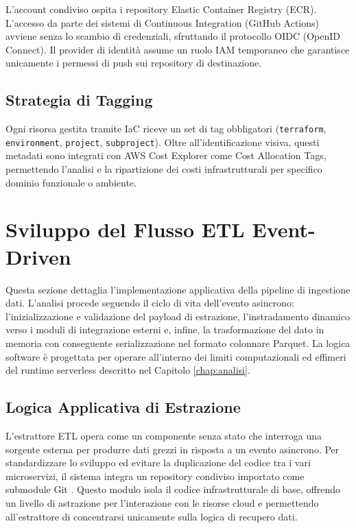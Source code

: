L'account condiviso ospita i repository Elastic Container Registry (ECR). L'accesso da parte dei sistemi di Continuous Integration (GitHub Actions) avviene senza lo scambio di credenziali, sfruttando il protocollo OIDC (OpenID Connect). Il provider di identità assume un ruolo IAM temporaneo che garantisce unicamente i permessi di push sui repository di destinazione.

\subsection{Strategia di Tagging}

Ogni risorsa gestita tramite IaC riceve un set di tag obbligatori (\texttt{terraform}, \texttt{environment}, \texttt{project}, \texttt{subproject}). Oltre all'identificazione visiva, questi metadati sono integrati con AWS Cost Explorer come Cost Allocation Tags, permettendo l'analisi e la ripartizione dei costi infrastrutturali per specifico dominio funzionale o ambiente.

\section{Sviluppo del Flusso ETL Event-Driven}
\label{sec:sviluppo-flusso-etl}
Questa sezione dettaglia l'implementazione applicativa della pipeline di ingestione dati. L'analisi procede seguendo il ciclo di vita dell'evento asincrono: l'inizializzazione e validazione del payload di estrazione, l'instradamento dinamico verso i moduli di integrazione esterni e, infine, la trasformazione del dato in memoria con conseguente serializzazione nel formato colonnare Parquet. La logica software è progettata per operare all'interno dei limiti computazionali ed effimeri del runtime serverless descritto nel Capitolo \ref{chap:analisi}.

\subsection{Logica Applicativa di Estrazione}

L'estrattore ETL opera come un componente senza stato che interroga una sorgente esterna per produrre dati grezzi in risposta a un evento asincrono. Per standardizzare lo sviluppo ed evitare la duplicazione del codice tra i vari microservizi, il sistema integra un repository condiviso importato come submodule Git \cite{Submodules}. Questo modulo isola il codice infrastrutturale di base, offrendo un livello di astrazione per l'interazione con le risorse cloud e permettendo all'estrattore di concentrarsi unicamente sulla logica di recupero dati.


